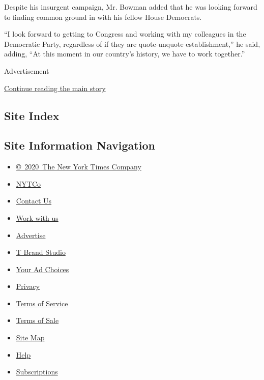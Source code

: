 Despite his insurgent campaign, Mr. Bowman added that he was looking
forward to finding common ground in with his fellow House Democrats.

``I look forward to getting to Congress and working with my colleagues
in the Democratic Party, regardless of if they are quote-unquote
establishment,'' he said, adding, ``At this moment in our country's
history, we have to work together.''

Advertisement

\protect\hyperlink{after-bottom}{Continue reading the main story}

\hypertarget{site-index}{%
\subsection{Site Index}\label{site-index}}

\hypertarget{site-information-navigation}{%
\subsection{Site Information
Navigation}\label{site-information-navigation}}

\begin{itemize}
\tightlist
\item
  \href{https://help.nytimes.com/hc/en-us/articles/115014792127-Copyright-notice}{©~2020~The
  New York Times Company}
\end{itemize}

\begin{itemize}
\tightlist
\item
  \href{https://www.nytco.com/}{NYTCo}
\item
  \href{https://help.nytimes.com/hc/en-us/articles/115015385887-Contact-Us}{Contact
  Us}
\item
  \href{https://www.nytco.com/careers/}{Work with us}
\item
  \href{https://nytmediakit.com/}{Advertise}
\item
  \href{http://www.tbrandstudio.com/}{T Brand Studio}
\item
  \href{https://www.nytimes.com/privacy/cookie-policy\#how-do-i-manage-trackers}{Your
  Ad Choices}
\item
  \href{https://www.nytimes.com/privacy}{Privacy}
\item
  \href{https://help.nytimes.com/hc/en-us/articles/115014893428-Terms-of-service}{Terms
  of Service}
\item
  \href{https://help.nytimes.com/hc/en-us/articles/115014893968-Terms-of-sale}{Terms
  of Sale}
\item
  \href{https://spiderbites.nytimes.com}{Site Map}
\item
  \href{https://help.nytimes.com/hc/en-us}{Help}
\item
  \href{https://www.nytimes.com/subscription?campaignId=37WXW}{Subscriptions}
\end{itemize}
